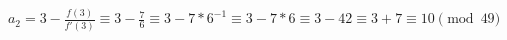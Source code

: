 \documentclass[preview]{standalone}
\begin{document}
\begin{align*}
a_2 = 3 - \frac{f(3)}{f'(3)}  \equiv 3 - \frac{7}{6} \equiv 3 - 7*6^{-1} \equiv 3 - 7*6 \equiv 3 - 42 \equiv 3 + 7 \equiv 10 \pmod{49}
\end{align*}
\end{document}
